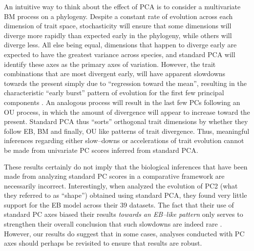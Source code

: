 \documentclass[a4paper,12pt]{article}
\begin{document}
An intuitive way to think about the effect of PCA is to consider a multivariate BM process on a phylogeny. Despite a constant rate of evolution across each dimension of trait space, stochasticity will ensure that some dimensions will diverge more rapidly than expected early in the phylogeny, while others will diverge less. All else being equal, dimensions that happen to diverge early are expected to have the greatest variance across species, and standard PCA will identify these axes as the primary axes of variation. However, the trait combinations that are most divergent early, will have apparent slowdowns towards the present simply due to ``regression toward the mean'', resulting in the characteristic ``early burst'' pattern of evolution for the first few principal components \citep[for a related point in the context of models of lineage diversification, see][]{Pennell2012}. An analogous process will result in the last few PCs following an OU process, in which the amount of divergence will appear to increase toward the present. Standard PCA thus ``sorts'' orthogonal trait dimensions by whether they follow EB, BM and finally, OU like patterns of trait divergence. Thus, meaningful inferences regarding either slow--downs or accelerations of trait evolution cannot be made from univariate PC scores inferred from standard PCA. 

These results certainly do not imply that the biological inferences that have been made from analyzing standard PC scores in a comparative framework are necessarily incorrect. 
Interestingly, when \citet{Harmon2010} analyzed the evolution of PC2 (what they referred to as ``shape'') obtained using standard PCA, they found very little support for the EB model across their 39 datasets. The fact that their use of standard PC axes biased their results \emph{towards an EB--like pattern} only serves to strengthen their overall conclusion that such slowdowns are indeed rare \citep[but see][]{SlaterPennell}. However, our results do suggest that in some cases, analyses conducted with PC axes should perhaps be revisited to ensure that results are robust.

\end{document}

